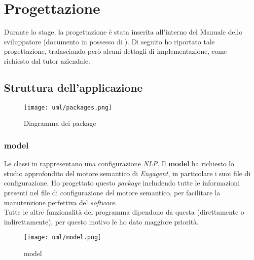 \section{Progettazione}
\label{sec:progettazione}
Durante lo stage, la progettazione è stata inserita all'interno del Manuale dello sviluppatore (documento in possesso di \company{}). Di seguito ho riportato tale progettazione, tralasciando però alcuni dettagli di implementazione, come richiesto dal tutor aziendale.

\subsection{Struttura dell'applicazione}
\begin{figure}[H]
    \centering
    \texttt{[image: uml/packages.png]} 
    \caption{Diagramma dei package}
    \label{logo:company}
\end{figure}

\subsubsection{model}\label{sec:progettazione:model} %
Le classi in  rappresentano una configurazione \textit{NLP}.
Il \textbf{model} ha richiesto lo studio approfondito del motore semantico di \textit{Engagent}, in particolare i suoi file di configurazione. Ho progettato questo \textit{package} includendo tutte le informazioni presenti nel file di configurazione del motore semantico, per facilitare la manutenzione perfettiva del \textit{software}.\\ Tutte le altre funzionalità del programma dipendono da questa (direttamente o indirettamente), per questo motivo le ho dato maggiore priorità. 

\begin{namespacedesc}
\end{namespacedesc}
\begin{figure}[H]
    \centering
    \texttt{[image: uml/model.png]} 
    \caption{model}
    \label{logo:company}
\end{figure}

